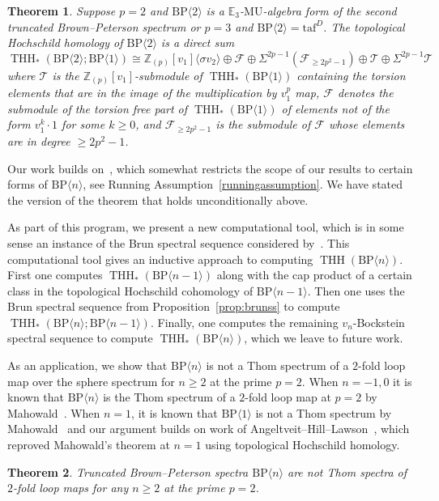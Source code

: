 \documentclass[11pt]{amsart}
\newcommand{\mr}[1]{\mathrm{#1}}
\newcommand{\Z}{\mathbb{Z}}
\newcommand{\BP}{\mr{BP}}
\DeclareMathOperator{\THH}{THH}
\newtheorem{thmx}{Theorem}
\theoremstyle{definition}
\numberwithin{equation}{section}
\numberwithin{figure}{section}
\begin{document}
\begin{thmx}\label{thm:main}
  Suppose $p=2$ and $\mathrm{BP}\langle 2\rangle$ is a $\mathbb{E}_3$-$\mathrm{MU}$-algebra form of the second truncated Brown--Peterson spectrum or $p=3$ and $\mathrm{BP}\langle 2\rangle=\mathrm{taf}^{D}$. 
  The topological Hochschild homology of $\BP\langle 2\rangle$ is a direct sum
  \[
    \THH_*(\BP \langle 2 \rangle ; \BP \langle 1 \rangle) \cong \Z_{(p)}[v_1] \langle \sigma v_2 \rangle \oplus \mathcal{F} \oplus \Sigma^{2p - 1} (\mathcal{F}_{\geq 2p^2 - 1}) \oplus \mathcal{T} \oplus \Sigma^{2p - 1} \mathcal{T}
  \]
  where $\mathcal{T}$ is the $\Z_{(p)}[v_1]$-submodule of $\THH_*(\BP \langle 1 \rangle)$ containing the torsion elements that are in the image of the multiplication by $v_1^p$ map,  $\mathcal{F}$ denotes the submodule of the torsion free part of $\THH_*(\BP \langle 1 \rangle)$ of elements not of the form $v_1^k \cdot 1$ for some $k \geq 0$, and $\mathcal{F}_{\geq 2p^2 -1}$ is the submodule of $\mathcal{F}$ whose elements are in degree $\geq 2p^2 -1$.
\end{thmx}
Our work builds on~\cite[Theorem~3.8]{ACH24}, which somewhat restricts the scope of our results to certain forms of $\BP\langle n\rangle$, see Running Assumption~\ref{runningassumption}. We have stated the version of the theorem that holds unconditionally above. 

As part of this program, we present a new computational tool, which is in some sense an instance of the Brun spectral sequence considered by~\cites{Bru00,Hon20}. This computational tool gives an inductive approach to computing $\THH(\BP\langle n\rangle)$. First one computes $\THH_*(\BP\langle n-1\rangle)$ along with the cap product of a certain class in the topological Hochschild cohomology of $\BP\langle n-1\rangle$. Then one uses the Brun spectral sequence from Proposition~\ref{prop:brunss} to compute $\THH_*(\BP\langle n\rangle;\BP\langle n-1\rangle)$.  Finally, one computes the remaining $v_{n}$-Bockstein spectral sequence to compute $\THH_*(\BP\langle n\rangle)$, which we leave to future work. 

As an application, we show that $\BP\langle n\rangle$ is not a Thom spectrum of a $2$-fold loop map over the sphere spectrum for $n\ge 2$ at the prime $p=2$. When $n=-1,0$ it is known that $\mathrm{BP}\langle n\rangle$ is the Thom spectrum of a $2$-fold loop map at $p=2$ by Mahowald~\cite{Mah79}. When $n=1$, it is known that $\BP\langle 1\rangle$ is not a Thom spectrum by Mahowald~\cite{Mah87} and our argument builds on work of Angeltveit--Hill--Lawson~\cite{AHL09}, which reproved Mahowald's theorem at $n=1$ using topological Hochschild homology. 
\begin{thmx}\label{thm:main-thom}
Truncated Brown--Peterson spectra $\BP\langle n\rangle$ are not Thom spectra of $2$-fold loop maps for any $n\ge 2$ at the prime $p=2$. 
\end{thmx}
\end{document}
